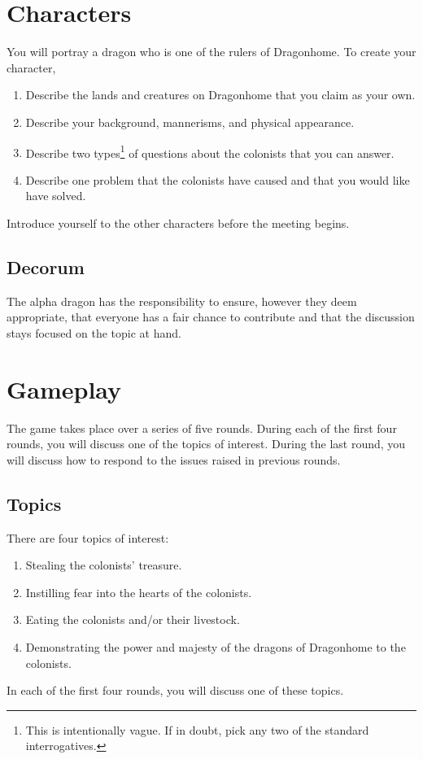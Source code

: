 \documentclass[a6paper, 11pt, parskip=half, DIV=15]{scrartcl}
\begin{document}
\section*{Characters}
You will portray a dragon who is one of the rulers of Dragonhome. To create your character,
\begin{enumerate}[nosep]
	\item Describe the lands and creatures on Dragonhome that you claim as your own.
	\item Describe your background, mannerisms, and physical appearance.
	\item Describe two types\footnote[1]{This is intentionally vague. If in doubt, pick any two of the standard interrogatives.} of questions about the colonists that you can answer.
	\item Describe one problem that the colonists have caused and that you would like have solved.
\end{enumerate}
Introduce yourself to the other characters before the meeting begins.

\newpage
\enlargethispage{1.75\baselineskip}
\subsection*{Decorum}
The alpha dragon has the responsibility to ensure, however they deem appropriate, that everyone has a fair chance to contribute and that the discussion stays focused on the topic at hand. %

\section*{Gameplay}
The game takes place over a series of five rounds. 
During each of the first four rounds, you will discuss one of the topics of interest.
During the last round, you will discuss how to respond to the issues raised in previous rounds. 

\subsection*{Topics}
There are four topics of interest:
\begin{enumerate}[nosep]
	\item Stealing the colonists' treasure.
	\item Instilling fear into the hearts of the colonists.
	\item Eating the colonists and/or their livestock.
	\item Demonstrating the power and majesty of the dragons of Dragonhome to the colonists.
\end{enumerate}
In each of the first four rounds, you will discuss one of these topics.
\end{document}
